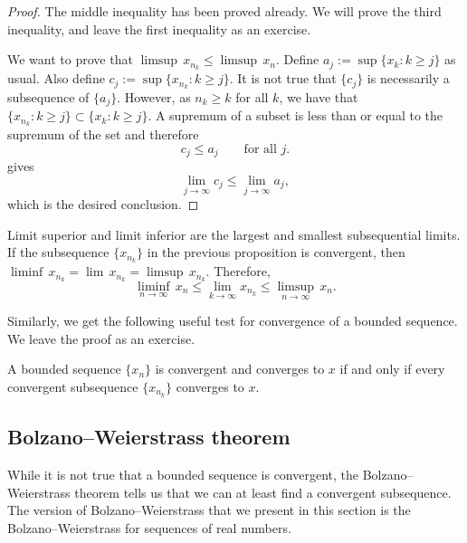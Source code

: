 \begin{proof}
The middle inequality has been proved already.  We will prove the third
inequality, and leave the first inequality as an exercise.

We want to prove that
$\limsup \, x_{n_k} \leq \limsup \, x_n$.  Define
$a_j := \sup \{ x_k : k \geq j \}$ 
as usual.
Also define
$c_j := \sup \{ x_{n_k} : k \geq j \}$.
It is not true that $\{ c_j \}$ is necessarily a subsequence of $\{ a_j \}$.  However,
as $n_k \geq k$ for all $k$, we have that
$\{ x_{n_k} : k \geq j \} \subset \{ x_k : k \geq j \}$.
A supremum of a subset is less than or equal to the supremum of the
set and therefore
\begin{equation*}
c_j \leq a_j \qquad \text{for all  $j$}.
\end{equation*}
 gives
\begin{equation*}
\lim_{j\to\infty} c_j \leq \lim_{j\to\infty} a_j ,
\end{equation*}
which is the desired conclusion.
\end{proof}

Limit superior and limit inferior
are the largest and smallest
subsequential limits.  If the subsequence $\{ x_{n_k} \}$ in the previous
proposition is convergent, then
$\liminf \, x_{n_k} = \lim\, x_{n_k} = \limsup \, x_{n_k}$.  Therefore,
\begin{equation*}
\liminf_{n\to\infty} \, x_n \leq
\lim_{k\to\infty} x_{n_k} \leq
\limsup_{n\to\infty} \, x_n .
\end{equation*}

Similarly, we get the following useful test for convergence
of a bounded sequence.  We leave the proof as an exercise.

\begin{prop} \label{seqconvsubseqconv:prop}
A bounded sequence $\{ x_n \}$ is convergent and converges to $x$
if and only if
every convergent subsequence
$\{ x_{n_k} \}$ converges to $x$.
\end{prop}

\subsection{Bolzano--Weierstrass theorem}

While it is not true that a bounded sequence is convergent, the
Bolzano--Weierstrass theorem tells us that we can at least find a convergent
subsequence.
The version of Bolzano--Weierstrass 
that we present in this section is the Bolzano--Weierstrass for
sequences of real numbers.

